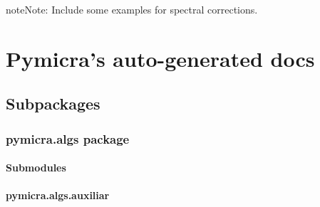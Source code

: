 \documentclass[a4paper,10pt,oneside]{sphinxmanual}
\begin{document}
\begin{notice}{note}{Note:}
Include some examples for spectral corrections.
\end{notice}


\chapter{Pymicra's auto-generated docs}
\label{pymicra:pymicra-s-auto-generated-docs}\label{pymicra::doc}

\section{Subpackages}
\label{pymicra:subpackages}

\subsection{pymicra.algs package}
\label{pymicra.algs:pymicra-algs-package}\label{pymicra.algs::doc}

\subsubsection{Submodules}
\label{pymicra.algs:submodules}

\subsubsection{pymicra.algs.auxiliar}
\label{pymicra.algs:pymicra-algs-auxiliar}\label{pymicra.algs:module-pymicra.algs.auxiliar}
\end{document}
